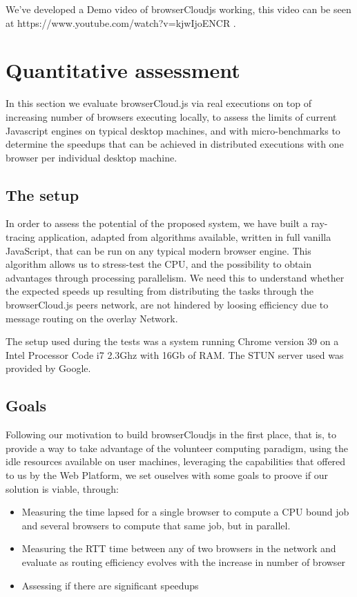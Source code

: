 We've developed a Demo video of browserCloudjs working, this video can be seen at https://www.youtube.com/watch?v=kjwIjoENCR .

\section{Quantitative assessment}

In this section we evaluate browserCloud.js via real executions on top of increasing number of browsers executing locally, to assess the limits of current Javascript engines on typical desktop machines, and with micro-benchmarks to determine the speedups that can be achieved in distributed executions with one browser per individual desktop machine.

\subsection{The setup}

In order to assess the potential of the proposed system, we have built a ray-tracing application, adapted from algorithms available, written in full vanilla JavaScript, that can be run on any typical modern browser engine. This algorithm allows us to stress-test the CPU,  and the possibility to obtain advantages through processing parallelism. We need this to understand whether the expected speeds up resulting from distributing the tasks through the browserCloud.js peers network, are not hindered by loosing efficiency due to message routing on the overlay Network.

The setup used during the tests was a system running Chrome version 39 on a Intel Processor Code i7 2.3Ghz with 16Gb of RAM. The STUN server used was provided by Google.

\subsection{Goals}

Following our motivation to build browserCloudjs in the first place, that is, to provide a way to take advantage of the volunteer computing paradigm, using the idle resources available on user machines, leveraging the capabilities that offered to us by the Web Platform, we set ouselves with some goals to proove if our solution is viable, through:

\begin{itemize}
    \item Measuring the time lapsed for a single browser to compute a CPU bound job and several browsers to compute that same job, but in parallel.
    \item Measuring the RTT time between any of two browsers in the network and evaluate as routing efficiency evolves with the increase in number of browser
    \item Assessing if there are significant speedups
\end{itemize}

